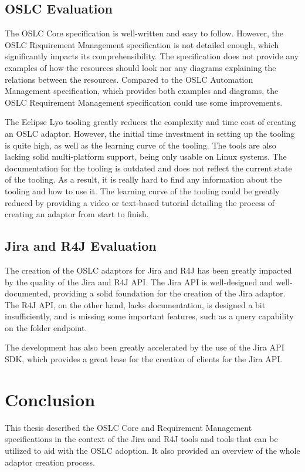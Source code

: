 \section{OSLC Evaluation}
The OSLC Core specification is well-written and easy to follow. However, the OSLC Requirement Management specification is not detailed enough, which significantly impacts its comprehensibility. The specification does not provide any examples of how the resources should look nor any diagrams explaining the relations between the resources. Compared to the OSLC Automation Management specification, which provides both examples and diagrams, the OSLC Requirement Management specification could use some improvements.

The Eclipse Lyo tooling greatly reduces the complexity and time cost of creating an OSLC adaptor. However, the initial time investment in setting up the tooling is quite high, as well as the learning curve of the tooling. The tools are also lacking solid multi-platform support, being only usable on Linux systems. The documentation for the tooling is outdated and does not reflect the current state of the tooling. As a result, it is really hard to find any information about the tooling and how to use it. The learning curve of the tooling could be greatly reduced by providing a video or text-based tutorial detailing the process of creating an adaptor from start to finish.

\section{Jira and R4J Evaluation}
The creation of the OSLC adaptors for Jira and R4J has been greatly impacted by the quality of the Jira and R4J API. The Jira API is well-designed and well-documented, providing a solid foundation for the creation of the Jira adaptor. The R4J API, on the other hand, lacks documentation, is designed a bit insufficiently, and is missing some important features, such as a query capability on the folder endpoint.

The development has also been greatly accelerated by the use of the Jira API SDK, which provides a great base for the creation of clients for the Jira API.


\chapter{Conclusion}
\label{chapter:conclusion}
This thesis described the OSLC Core and Requirement Management specifications in the context of the Jira and R4J tools and tools that can be utilized to aid with the OSLC adoption. It also provided an overview of the whole adaptor creation process.

